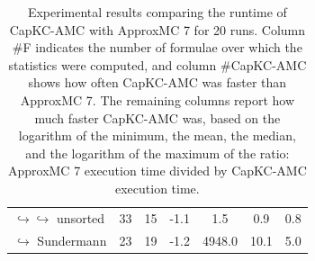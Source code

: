 \documentclass{article}
\newcommand\approxmc[0]{ApproxMC\xspace}
\newcommand\capkcamc[0]{CapKC-AMC\xspace}
\begin{document}
\begin{table}[h!]
\begin{tabular}{l|c|c|c|c|c|c}
$\hookrightarrow \hookrightarrow$ unsorted & 33 & 15 &  -1.1 &   1.5 &   0.9 &   0.8 \\
$\hookrightarrow$ Sundermann \cite{SBK+:SPLC24} & 23 & 19 &  -1.2 & 4948.0 &  10.1 &   5.0 \\
            \end{tabular}
                \caption{Experimental results comparing the runtime of \capkcamc with \approxmc7 for 20 runs.
            Column \#F indicates the number of formulae over which the statistics were computed, and column \#\capkcamc shows how often \capkcamc was faster than \approxmc7.
            The remaining columns report how much faster \capkcamc was, based on the logarithm of the minimum, the mean, the median, and the logarithm of the maximum of the ratio: \approxmc7 execution time divided by \capkcamc execution time.
        }
        \label{capkc:tab:appmc:run}
    \end{table}
\end{document}
